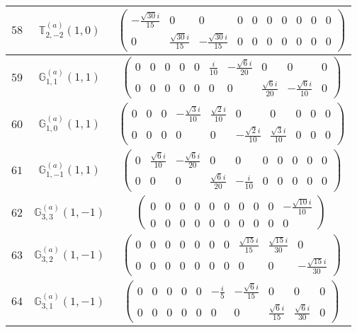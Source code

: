 \documentclass[fleqn,8pt,landscape]{jsarticle}
\begin{document}
\begin{center}
\begin{longtable}{ccc}
$ 58 $ & $ \mathbb{T}_{2,-2}^{(a)}(1,0) $ & $ \begin{pmatrix} - \frac{\sqrt{30} i}{15} & 0 & 0 & 0 & 0 & 0 & 0 & 0 & 0 & 0 \\ 0 & \frac{\sqrt{30} i}{15} & - \frac{\sqrt{30} i}{15} & 0 & 0 & 0 & 0 & 0 & 0 & 0 \end{pmatrix} $ \\ \hline
$ 59 $ & $ \mathbb{G}_{1,1}^{(a)}(1,1) $ & $ \begin{pmatrix} 0 & 0 & 0 & 0 & 0 & \frac{i}{10} & - \frac{\sqrt{6} i}{20} & 0 & 0 & 0 \\ 0 & 0 & 0 & 0 & 0 & 0 & 0 & \frac{\sqrt{6} i}{20} & - \frac{\sqrt{6} i}{10} & 0 \end{pmatrix} $ \\ \hline
$ 60 $ & $ \mathbb{G}_{1,0}^{(a)}(1,1) $ & $ \begin{pmatrix} 0 & 0 & 0 & - \frac{\sqrt{3} i}{10} & \frac{\sqrt{2} i}{10} & 0 & 0 & 0 & 0 & 0 \\ 0 & 0 & 0 & 0 & 0 & - \frac{\sqrt{2} i}{10} & \frac{\sqrt{3} i}{10} & 0 & 0 & 0 \end{pmatrix} $ \\ \hline
$ 61 $ & $ \mathbb{G}_{1,-1}^{(a)}(1,1) $ & $ \begin{pmatrix} 0 & \frac{\sqrt{6} i}{10} & - \frac{\sqrt{6} i}{20} & 0 & 0 & 0 & 0 & 0 & 0 & 0 \\ 0 & 0 & 0 & \frac{\sqrt{6} i}{20} & - \frac{i}{10} & 0 & 0 & 0 & 0 & 0 \end{pmatrix} $ \\ \hline
$ 62 $ & $ \mathbb{G}_{3,3}^{(a)}(1,-1) $ & $ \begin{pmatrix} 0 & 0 & 0 & 0 & 0 & 0 & 0 & 0 & 0 & - \frac{\sqrt{10} i}{10} \\ 0 & 0 & 0 & 0 & 0 & 0 & 0 & 0 & 0 & 0 \end{pmatrix} $ \\ \hline
$ 63 $ & $ \mathbb{G}_{3,2}^{(a)}(1,-1) $ & $ \begin{pmatrix} 0 & 0 & 0 & 0 & 0 & 0 & 0 & \frac{\sqrt{15} i}{15} & \frac{\sqrt{15} i}{30} & 0 \\ 0 & 0 & 0 & 0 & 0 & 0 & 0 & 0 & 0 & - \frac{\sqrt{15} i}{30} \end{pmatrix} $ \\ \hline
$ 64 $ & $ \mathbb{G}_{3,1}^{(a)}(1,-1) $ & $ \begin{pmatrix} 0 & 0 & 0 & 0 & 0 & - \frac{i}{5} & - \frac{\sqrt{6} i}{15} & 0 & 0 & 0 \\ 0 & 0 & 0 & 0 & 0 & 0 & 0 & \frac{\sqrt{6} i}{15} & \frac{\sqrt{6} i}{30} & 0 \end{pmatrix} $ \\ \hline

\end{longtable}
\end{center}
\end{document}
